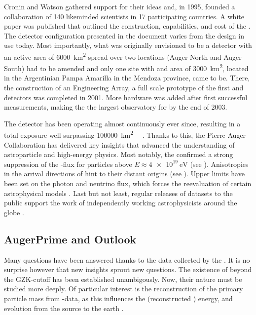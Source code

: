 Cronin and Watson gathered support for their ideas and, in 1995, founded a 
collaboration of 140 likeminded scientists in 17 participating countries. A 
white paper was published that outlined the construction, capabilities, and 
cost of the \PAO \cite{thepierreaugercollaborationPierreAugerObservatory1997}. 
The detector configuration presented in the document varies from the design in 
use today. Most importantly, what was originally envisioned to be a detector 
with an active area of \SI{6000}{\km\squared} spread over two locations (Auger 
North and Auger South) had to be amended and only one site with and area of 
\SI{3000}{\km\squared}, located in the Argentinian Pampa Amarilla in the 
Mendoza province, came to be. There, the construction of an Engineering Array, 
a full scale prototype of the first \SD and \FD detectors was completed in 
2001. More hardware was added after first successful measurements, making the 
\PAO the largest observatory for \CRs by the end of 2003.

The detector has been operating almost continuously ever since, resulting in a 
total exposure well surpassing \SI{100000}{\km\squared\sr\year} 
\cite{aabPierreAugerObservatory2020}. Thanks to this, the Pierre Auger 
Collaboration has delivered key insights that advanced the understanding of 
astroparticle and high-energy physics. Most notably, the \PAO confirmed a 
strong suppression of the \CR-flux for particles above 
$E\approx\SI{4e19}{\eV}$ \cite{yamamotoUHECRSpectrumMeasured2007} (see 
). Anisotropies in the arrival directions of \UHECRs 
hint to their distant origins
\cite{thepierreaugercollaborationObservationLargescaleAnisotropy2017} (see 
). Upper limits have been set on the \UHE photon and
neutrino flux, which forces the reevaluation of certain astrophysical models 
\cite{collaborationPierreAugerObservatory2011, abreuSearchUltrahighEnergy2011}.
Last but not least, regular releases of datasets to the public support the work 
of independently working astrophysicists around the globe 
\cite{pierreaugercollaborationPierreAugerObservatory2025}.

\subsection{AugerPrime and Outlook}
\label{ssec:augerprime-and-outlook}

Many questions have been answered thanks to the data collected by the \PAO. It
is no surprise however that new insights sprout new questions. The existence of
\UHECRs beyond the GZK-cutoff has been established unambigously. Now, their
nature must be studied more deeply. Of particular interest is the 
reconstruction of the primary particle mass from \EAS-data, as this influences 
the \CRs (reconstructed \cite{yushkovMassCompositionCosmic2021}) energy, and 
evolution from the source to the earth 
\cite{strongCosmicRayPropagationInteractions2007, 
flaggsStudyingMassSensitivity2024}.

